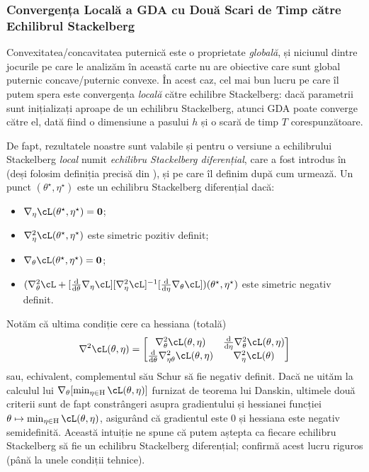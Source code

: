 \documentclass[../../book-main_ro.tex]{subfiles}
\begin{document}
\subsubsection{Convergența Locală a GDA cu Două Scari de Timp către Echilibrul Stackelberg}

Convexitatea/concavitatea puternică este o proprietate \textit{globală}, și niciunul dintre jocurile pe care le analizăm în această carte nu are obiective care sunt global puternic concave/puternic convexe. În acest caz, cel mai bun lucru pe care îl putem spera este convergența \textit{locală} către echilibre Stackelberg: dacă parametrii sunt inițializați aproape de un echilibru Stackelberg, atunci GDA poate converge către el, dată fiind o dimensiune a pasului \(h\) și o scară de timp \(T\) corespunzătoare. 

De fapt, rezultatele noastre sunt valabile și pentru o versiune a echilibrului Stackelberg \textit{local} numit \textit{echilibru Stackelberg diferențial}, care a fost introdus în \cite{fiez2019convergence} (deși folosim definiția precisă din \cite{li2022convergence}), și pe care îl definim după cum urmează. Un punct \((\theta^{\star}, \eta^{\star})\) este un echilibru Stackelberg diferențial dacă:
\begin{itemize}
    \item \(\nabla_{\eta}\cL(\theta^{\star}, \eta^{\star}) = \vzero\);
    \item \(\nabla_{\eta}^{2}\cL(\theta^{\star}, \eta^{\star})\) este simetric pozitiv definit;
    \item \(\nabla_{\theta}\cL(\theta^{\star}, \eta^{\star}) = \vzero\);
    \item \((\nabla_{\theta}^{2}\cL + [\odv*{\nabla_{\eta}\cL}{\theta}][\nabla_{\eta}^{2}\cL]^{-1}[\odv*{\nabla_{\theta}\cL}{\eta}])(\theta^{\star}, \eta^{\star})\) este simetric negativ definit.
\end{itemize}
Notăm că ultima condiție cere ca hessiana (totală)
\begin{equation}
    \nabla^{2} \cL(\theta, \eta) = \mat{\nabla_{\theta}^{2}\cL(\theta, \eta) & \odv*{\nabla_{\theta}^{2}\cL(\theta, \eta)}{\eta} \\ \odv*{\nabla_{\eta\theta}^{2}\cL(\theta, \eta)}{\theta} & \nabla_{\eta}^{2}\cL(\theta)}
\end{equation}
sau, echivalent, complementul său Schur să fie negativ definit. Dacă ne uităm la calculul lui \(\nabla_{\theta}[\min_{\eta \in \Eta}\cL(\theta, \eta)]\) furnizat de teorema lui Danskin, ultimele două criterii sunt de fapt constrângeri asupra gradientului și hessianei funcției \(\theta \mapsto \min_{\eta \in \Eta}\cL(\theta, \eta)\), asigurând că gradientul este \(0\) și hessiana este negativ semidefinită. Această intuiție ne spune că putem aștepta ca fiecare echilibru Stackelberg să fie un echilibru Stackelberg diferențial; \cite{fiez2020implicit} confirmă acest lucru riguros (până la unele condiții tehnice).
\end{document}
